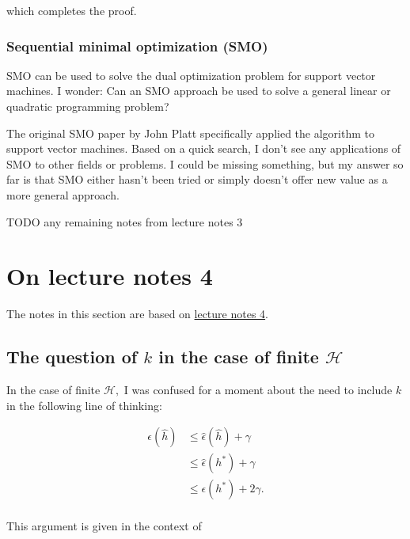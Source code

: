 \documentclass[]{article}
\begin{document}
which completes the proof.

\subsubsection{Sequential minimal optimization
(SMO)}\label{sequential-minimal-optimization-smo}

SMO can be used to solve the dual optimization problem for support
vector machines. I wonder: Can an SMO approach be used to solve a
general linear or quadratic programming problem?

The original SMO paper by John Platt specifically applied the algorithm
to support vector machines. Based on a quick search, I don't see any
applications of SMO to other fields or problems. I could be missing
something, but my answer so far is that SMO either hasn't been tried or
simply doesn't offer new value as a more general approach.

TODO any remaining notes from lecture notes 3

\section{On lecture notes 4}\label{on-lecture-notes-4}

The notes in this section are based on
\href{http://cs229.stanford.edu/notes/cs229-notes4.pdf}{lecture notes
4}.

\subsection{\texorpdfstring{The question of \(k\) in the case of finite
\(\mathcal H\)}{The question of k in the case of finite \textbackslash{}mathcal H}}\label{the-question-of-k-in-the-case-of-finite-mathcal-h}

\newcommand{\eps}{\epsilon}

In the case of finite \(\mathcal H,\) I was confused for a moment about
the need to include \(k\) in the following line of thinking:

\[\begin{aligned}
\eps (\hat h) & \le \hat\eps (\hat h) + \gamma \\
              & \le \hat\eps (h^*) + \gamma \\
              & \le \eps     (h^*) + 2 \gamma. \\
\end{aligned}\]

This argument is given in the context of
\end{document}
